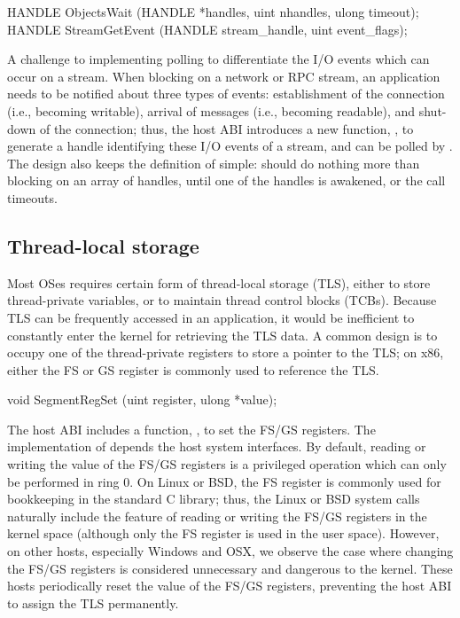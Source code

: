 \begin{paldef}
HANDLE ObjectsWait    (HANDLE *handles, uint nhandles,
                       ulong timeout);
HANDLE StreamGetEvent (HANDLE stream_handle,
                       uint event_flags);
\end{paldef}


A challenge to implementing polling
to differentiate the I/O events which can occur on a stream.
When blocking on a network or RPC stream, an application needs to be notified
about three types of events:
establishment of the connection (i.e., becoming writable), arrival of messages (i.e., becoming readable), and shut-down of the connection;
thus, the \graphene{} host ABI introduces a new function,
,
to generate a handle identifying these I/O events of a stream,
and can be polled by .
The design also keeps the definition of  simple:
 should do nothing more than blocking on an array of handles,
until one of the handles
is awakened, or the call timeouts.


\subsection*{Thread-local storage}


Most OSes requires certain form of thread-local storage (TLS),
either to store thread-private variables, or to maintain thread control blocks (TCBs).
Because TLS can be frequently accessed
in an application,
it would be inefficient to constantly
enter the kernel for retrieving the TLS data.
A common design is to occupy one of the thread-private registers
to store a pointer to the TLS;
on x86, either the FS or GS register is commonly used to reference the TLS.




\begin{paldef}
void SegmentRegSet (uint register, ulong *value);
\end{paldef}


The host ABI includes a function, , to set the FS/GS registers.
The implementation of 
depends the host system interfaces. 
By default, reading or writing the value of the FS/GS registers is a privileged operation
which can only be performed in ring 0.
On Linux or BSD, the FS register is commonly used for bookkeeping in the standard C library;
thus, the Linux or BSD system calls naturally include the feature of reading or writing the FS/GS registers in the kernel space (although only the FS register is used in the user space).
However, on other hosts, especially Windows and OSX,
we observe the case where changing the FS/GS registers is considered unnecessary and dangerous to the kernel.
These hosts periodically reset the value of the FS/GS registers,
preventing the host ABI to assign the TLS permanently.


